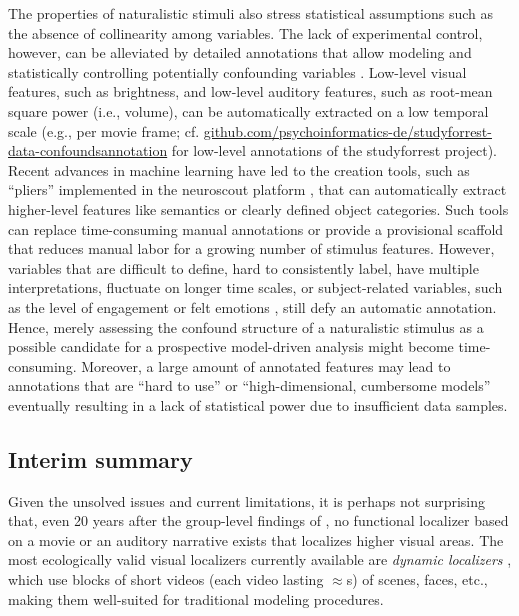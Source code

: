 %
The properties of naturalistic stimuli also stress statistical assumptions such
as the absence of collinearity among variables.
%
The lack of experimental control, however, can be alleviated by detailed
annotations that allow modeling and statistically controlling potentially
confounding variables \citep[e.g.,][]{deniz2019representation}.
%
Low-level visual features, such as brightness, and low-level auditory features,
such as root-mean square power (i.e., volume), can be automatically extracted on
a low temporal scale (e.g., per movie frame; cf.
\href{https://github.com/psychoinformatics-de/studyforrest-data-confoundsannotation
}{\url{github.com/psychoinformatics-de/studyforrest-data-confoundsannotation}}
for low-level annotations of the studyforrest project).
%
Recent advances in machine learning have led to the creation tools, such as
``pliers'' \citep{mcnamara2017developing} implemented in the neuroscout platform
\citep[\href{https://neuroscout.org/}{\url{neuroscout.org}};][]{delavega2022neuroscout},
that can automatically extract higher-level features like semantics or clearly
defined object categories.
%
Such tools can replace time-consuming manual annotations or provide a
provisional scaffold that reduces manual labor for a growing number of stimulus
features.
%
However, variables that are difficult to define, hard to consistently label,
have multiple interpretations, fluctuate on longer time scales, or
subject-related variables, such as the level of engagement or felt emotions
\citep[cf.][]{lettieri2019emotionotopy, saarimaki2021naturalistic}, still defy
an automatic annotation.
%
Hence, merely assessing the confound structure of a naturalistic stimulus as a
possible candidate for a prospective model-driven analysis might become
time-consuming.
%
Moreover, a large amount of annotated features may lead to annotations that are
``hard to use'' \citep[][p. 2]{richard2019fast} or ``high-dimensional,
cumbersome models'' \citep[][p. 2]{richard2019fast} eventually resulting in a
lack of statistical power due to insufficient data samples.



\subsection{Interim summary}
%
Given the unsolved issues and current limitations, it is perhaps not surprising
that, even 20 years after the group-level findings of
\citet{bartels2004mapping}, no functional localizer based on a movie or an
auditory narrative exists that localizes higher visual areas.
%
The most ecologically valid visual localizers currently available are
\textit{dynamic localizers} \citep[e.g.,][]{pitcher2011differential,
fox2009defining}, which use blocks of short videos (each video lasting
$\approx$\unit[2-3]{s}) of scenes, faces, etc., making them well-suited for
traditional modeling procedures.

